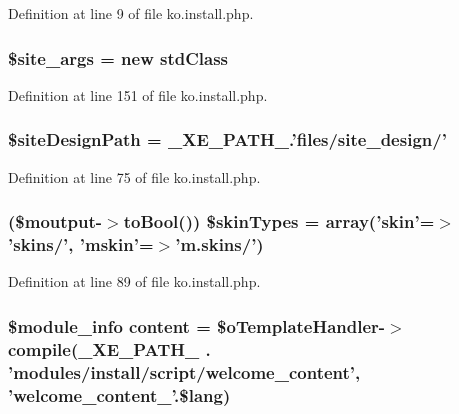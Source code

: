 Definition at line 9 of file ko.\+install.\+php.

\hypertarget{ko_8install_8php_a19e0fcfacd69155c9cc255e5500f6ccc}{
\subsubsection[{\$site\+\_\+args}]{\setlength{\rightskip}{0pt plus 5cm}\$site\+\_\+args = new std\+Class}}\label{ko_8install_8php_a19e0fcfacd69155c9cc255e5500f6ccc}


Definition at line 151 of file ko.\+install.\+php.

\hypertarget{ko_8install_8php_a0b79a974b91157b79d83cc0be7e3247c}{
\subsubsection[{\$site\+Design\+Path}]{\setlength{\rightskip}{0pt plus 5cm}\$site\+Design\+Path = \+\_\+\+X\+E\+\_\+\+P\+A\+T\+H\+\_\+.'files/site\+\_\+design/'}}\label{ko_8install_8php_a0b79a974b91157b79d83cc0be7e3247c}


Definition at line 75 of file ko.\+install.\+php.

\hypertarget{ko_8install_8php_aa61073b7b359568eb3459da113fd8cdf}{
\subsubsection[{\$skin\+Types}]{ (\$moutput-\/$>$to\+Bool()) \$skin\+Types = array('skin'=$>$'skins/', 'mskin'=$>$'m.\+skins/')}}\label{ko_8install_8php_aa61073b7b359568eb3459da113fd8cdf}


Definition at line 89 of file ko.\+install.\+php.

\hypertarget{ko_8install_8php_a65dddc3e5e47cb506e6b5417ffb3bdef}{
\subsubsection[{content}]{\setlength{\rightskip}{0pt plus 5cm}\$module\+\_\+info {\bf content} = \$o\+Template\+Handler-\/$>$compile({\bf \+\_\+\+X\+E\+\_\+\+P\+A\+T\+H\+\_\+} . 'modules/{\bf install}/script/welcome\+\_\+content', 'welcome\+\_\+content\+\_\+'.\$lang)}}\label{ko_8install_8php_a65dddc3e5e47cb506e6b5417ffb3bdef}


